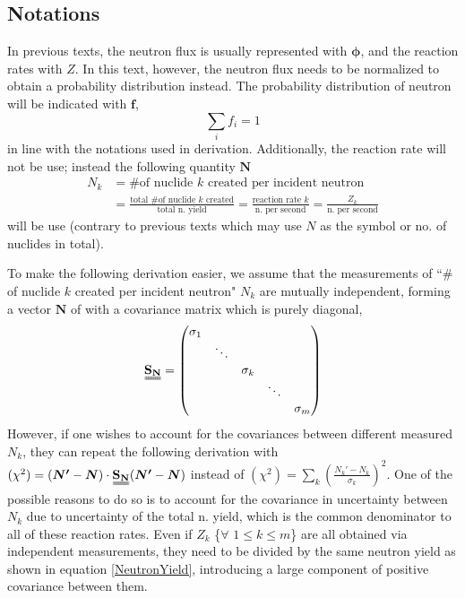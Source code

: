 \documentclass[a4paper, 12pt]{article}
\newcommand{\matr}[1]{\uuline{\bf{#1}}}
\newcommand{\ve}[1]{\boldsymbol{#1}}
\begin{document}
\subsection{Notations}\label{Notations}
    In previous texts, the neutron flux is usually represented with $\ve{\phi}$, and the reaction rates with $Z$. In this text, however, the neutron flux needs to be normalized to obtain a probability distribution instead. The probability distribution of neutron will be indicated with $\ve{f}$,
    \begin{equation}
        \sum_i f_i =1
    \end{equation}
    in line with the notations used in \cite{MAXED1998Reginatto} derivation. Additionally, the reaction rate will not be use; instead the following quantity $\ve{N}$
    \begin{align}
    N_k &= \text{\# of nuclide $k$ created per incident neutron}\\
        &= \frac{\text{total \# of nuclide $k$ created}}{\text{total n. yield}} = \frac{\text{reaction rate }k}{\text{n. per second}} = \frac{Z_k}{\text{n. per second}}
        \label{NeutronYield}
    \end{align}
    will be use (contrary to previous texts which may use $N$ as the symbol or no. of nuclides in total).

    To make the following derivation easier, we assume that the measurements of ``\# of nuclide $k$ created per incident neutron" $N_k$ are mutually independent, forming a vector $\ve{N}$ of with a covariance matrix which is purely diagonal,
\begin{align}
\uuline{\bf{S_N}}=
\begin{pmatrix}
    \sigma_1 &  &  &  & \\
	 & \ddots &  &  & \\
    &  & \sigma_k &  & \\
     &  &  & \ddots & \\
     &  &  &  & \sigma_m\\
\end{pmatrix}
\end{align}
    However, if one wishes to account for the covariances between different measured $N_k$, they can repeat the following derivation with $(\chi^2) = (\ve{N'}-\ve{N}) \cdot \matr{S_N}(\ve{N'}-\ve{N})$ instead of $(\chi^2) = \sum\limits_k (\frac{N_k '-N_k}{\sigma_k})^2$. One of the possible reasons to do so is to account for the covariance in uncertainty between $N_k$ due to uncertainty of the total n. yield, which is the common denominator to all of these reaction rates. Even if $Z_k$  \{$\forall$ $1\le k\le m$\} are all obtained via independent measurements, they need to be divided by the same neutron yield as shown in equation \ref{NeutronYield}, introducing a large component of positive covariance between them.
\end{document}
